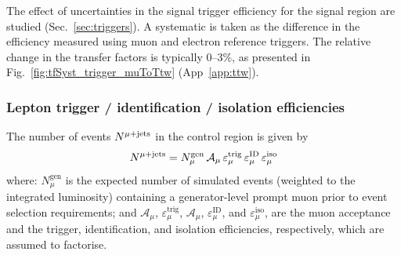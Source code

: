 The effect of uncertainties in the signal trigger efficiency for the
signal region are studied (Sec.~\ref{sec:triggers}). A systematic is
taken as the difference in the efficiency measured using muon and
electron reference triggers.  The relative change in the transfer
factors is typically 0--3\%, as presented in
Fig.~\ref{fig:tfSyst_trigger_muToTtw} (App~\ref{app:ttw}).

\subsubsection{Lepton trigger / identification / isolation efficiencies}
\label{sec:leptonSyst}

The number of events $N^{\mu + \textrm{jets}}$ in the \mj control region is given by
\begin{equation}
  \label{eq:lepton_eff_mj}
  N^{\mu + \textrm{jets}} = 
  N^\textrm{gen}_\mu \,
  \mathcal{A}_\mu \,
  \varepsilon^\textrm{trig}_\mu \,
  \varepsilon^\textrm{ID}_\mu \,
  \varepsilon^\textrm{iso}_\mu  
\end{equation}
where: $N^\textrm{gen}_\mu$ is the expected number of simulated events
(weighted to the integrated luminosity) containing a generator-level
prompt muon prior to event selection requirements; and
$\mathcal{A}_\mu$, $\varepsilon^\textrm{trig}_\mu$,
$\mathcal{A}_\mu$, $\varepsilon^\textrm{ID}_\mu$, and
$\varepsilon^\textrm{iso}_\mu$, are the muon acceptance and the
trigger, identification, and isolation efficiencies, respectively,
which are assumed to factorise. 


